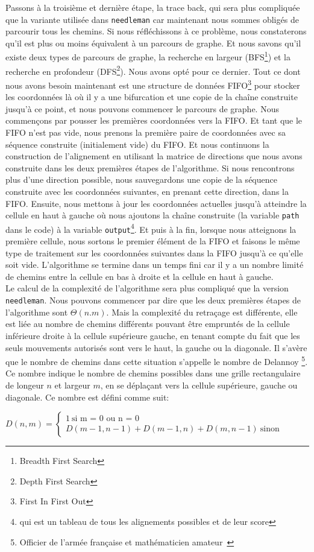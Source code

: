 \documentclass[12pt]{article}
\begin{document}
Passons à la troisième et dernière étape, la trace back, qui sera plus compliquée que la variante utilisée dans \texttt{needleman} car maintenant nous sommes obligés de parcourir tous les chemins. Si nous réfléchissons à ce problème, nous constaterons qu’il est plus ou moins équivalent à un parcours de graphe. Et nous savons qu'il existe deux types de parcours de graphe, la recherche en largeur (BFS\footnote{Breadth First Search}) et la recherche en profondeur (DFS\footnote{Depth First Search}). Nous avons opté pour ce dernier. Tout ce dont nous avons besoin maintenant est une structure de données FIFO\footnote{First In First Out} pour stocker les coordonnées là où il y a une bifurcation et une copie de la chaîne construite jusqu'à ce point, et nous pouvons commencer le parcours de graphe. Nous commençons par pousser les premières coordonnées vers la FIFO. Et tant que le FIFO n'est pas vide, nous prenons la première paire de coordonnées avec sa séquence construite (initialement vide) du FIFO. Et nous continuons la construction de l'alignement en utilisant la matrice de directions que nous avons construite dans les deux premières étapes de l'algorithme. Si nous rencontrons plus d'une direction possible, nous sauvegardons une copie de la séquence construite avec les coordonnées suivantes, en prenant cette direction, dans la FIFO. Ensuite, nous mettons à jour les coordonnées actuelles jusqu'à atteindre la cellule en haut à gauche où nous ajoutons la chaîne construite (la variable \texttt{path} dans le code) à la variable \texttt{output}\footnote{qui est un tableau de tous les alignements possibles et de leur score}. Et puis à la fin, lorsque nous atteignons la première cellule, nous sortons le premier élément de la FIFO et faisons le même type de traitement sur les coordonnées suivantes dans la FIFO jusqu'à ce qu'elle soit vide.
L'algorithme se termine dans un temps fini car il y a un nombre limité de chemins entre la cellule en bas à droite et la cellule en haut à gauche. \\

Le calcul de la complexité de l'algorithme sera plus compliqué que la version \texttt{needleman}. Nous pouvons commencer par dire que les deux premières étapes de l'algorithme sont $\Theta(n.m)$. Mais la complexité du retraçage est différente, elle est liée au nombre de chemins différents pouvant être empruntés de la cellule inférieure droite à la cellule supérieure gauche, en tenant compte du fait que les seuls mouvements autorisés sont vers le haut, la gauche ou la diagonale. Il s'avère que le nombre de chemins dans cette situation s'appelle le nombre de Delannoy \footnote{Officier de l'armée française et mathématicien amateur~\cite{delannoy}}. Ce nombre indique le nombre de chemins possibles dans une grille rectangulaire de longeur $n$ et largeur $m$, en se déplaçant vers la cellule supérieure, gauche ou diagonale. Ce nombre est défini comme suit:
\begin{center}
$
D(n, m) =
\begin{cases}
1~\text{si m = 0 ou n = 0}\\
D(m - 1, n - 1) + D(m - 1, n) + D(m, n - 1)~\text{sinon}
\end{cases}
$
\end{center}
\end{document}
